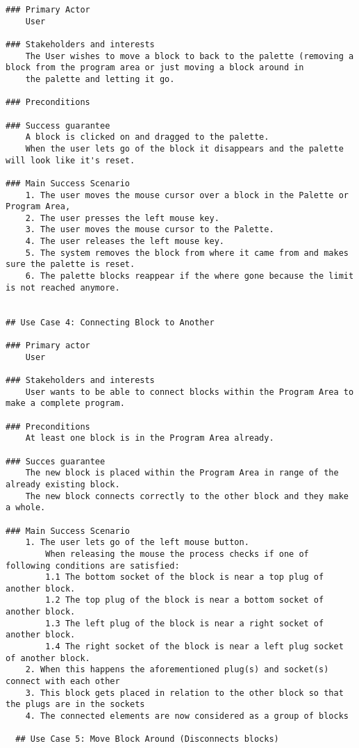 \documentclass{article}
\begin{document}
\begin{verbatim}
### Primary Actor 
    User
    
### Stakeholders and interests
    The User wishes to move a block to back to the palette (removing a block from the program area or just moving a block around in
    the palette and letting it go.
    
### Preconditions
    
### Success guarantee
    A block is clicked on and dragged to the palette.
    When the user lets go of the block it disappears and the palette will look like it's reset.
    
### Main Success Scenario
    1. The user moves the mouse cursor over a block in the Palette or Program Area, 
    2. The user presses the left mouse key.
    3. The user moves the mouse cursor to the Palette. 
    4. The user releases the left mouse key.
    5. The system removes the block from where it came from and makes sure the palette is reset.
    6. The palette blocks reappear if the where gone because the limit is not reached anymore.


## Use Case 4: Connecting Block to Another

### Primary actor
    User
    
### Stakeholders and interests
    User wants to be able to connect blocks within the Program Area to make a complete program.

### Preconditions
    At least one block is in the Program Area already.

### Succes guarantee
    The new block is placed within the Program Area in range of the already existing block.
    The new block connects correctly to the other block and they make a whole.

### Main Success Scenario
    1. The user lets go of the left mouse button. 
        When releasing the mouse the process checks if one of following conditions are satisfied:
        1.1 The bottom socket of the block is near a top plug of another block. 
        1.2 The top plug of the block is near a bottom socket of another block.
        1.3 The left plug of the block is near a right socket of another block.
        1.4 The right socket of the block is near a left plug socket of another block. 
    2. When this happens the aforementioned plug(s) and socket(s) connect with each other
    3. This block gets placed in relation to the other block so that the plugs are in the sockets
    4. The connected elements are now considered as a group of blocks

  ## Use Case 5: Move Block Around (Disconnects blocks)


\end{verbatim}
\end{document}
